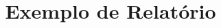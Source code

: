 \documentclass[minted]{relatorio}
\title{Exemplo de Relatório}
\begin{document}


\maketitle{}







\nocite{*}
\printbibliography{}
\end{document}
